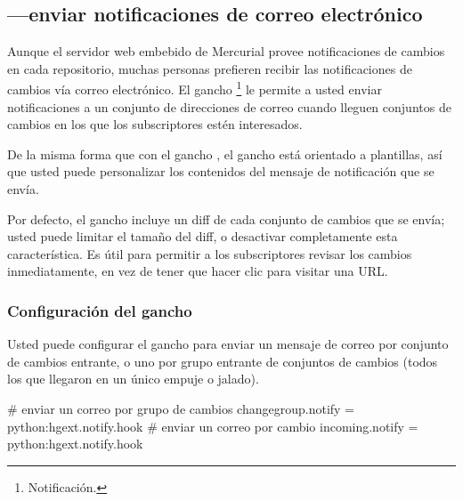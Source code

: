 \subsection{---enviar notificaciones de correo
electrónico}

Aunque el servidor web embebido de Mercurial provee notificaciones de
cambios en cada repositorio, muchas personas prefieren recibir las
notificaciones de cambios vía correo electrónico. El gancho
\footnote{Notificación.} le permite a usted enviar
notificaciones a un conjunto de direcciones de correo cuando lleguen
conjuntos de cambios en los que los subscriptores estén interesados.

De la misma forma que con el gancho , el gancho
 está orientado a plantillas, así que usted puede
personalizar los contenidos del mensaje de notificación que se envía.

Por defecto, el gancho  incluye un diff de cada conjunto
de cambios que se envía; usted puede limitar el tamaño del diff, o
desactivar completamente esta característica. Es útil para permitir a
los subscriptores revisar los cambios inmediatamente, en vez de tener
que hacer clic para visitar una URL.

\subsubsection{Configuración del gancho }

Usted puede configurar el gancho  para enviar un mensaje
de correo por conjunto de cambios entrante, o uno por grupo entrante
de conjuntos de cambios (todos los que llegaron en un único empuje o
jalado).
\begin{codesample2}
  [hooks]
  # enviar un correo por grupo de cambios
  changegroup.notify = python:hgext.notify.hook
  # enviar un correo por cambio
  incoming.notify = python:hgext.notify.hook
\end{codesample2}

